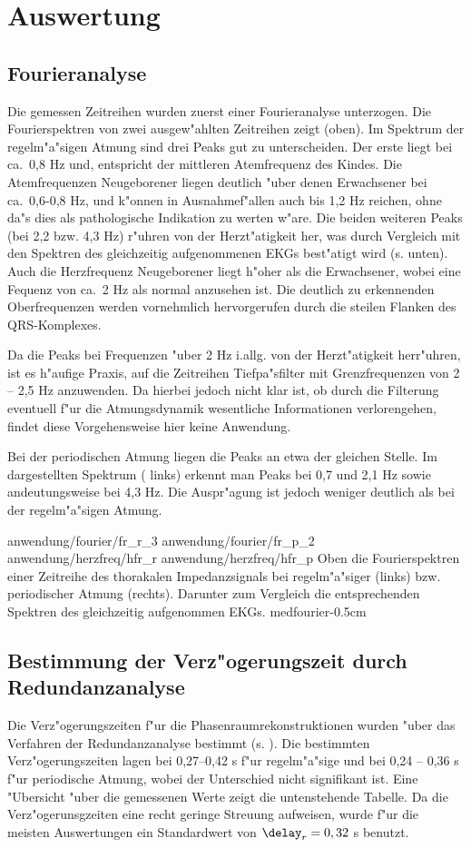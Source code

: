 \section{Auswertung} 

\subsection{Fourieranalyse}
Die gemessen Zeitreihen wurden zuerst einer Fourieranalyse
unterzogen. Die Fourierspektren von zwei ausgew"ahlten Zeitreihen zeigt 
(oben). Im Spektrum der regelm"a"sigen Atmung sind drei Peaks gut zu unterscheiden. Der
erste liegt bei ca.\ 0,8 Hz und, entspricht der mittleren Atemfrequenz des Kindes. Die
Atemfrequenzen Neugeborener liegen deutlich "uber denen Erwachsener bei ca.\ 
0,6-0,8 Hz, und k"onnen in Ausnahmef"allen auch bis 1,2 Hz reichen, ohne da"s dies als
pathologische Indikation zu werten w"are. Die beiden weiteren Peaks (bei 2,2 bzw. 4,3 Hz)
r"uhren von der Herzt"atigkeit her, was durch Vergleich mit den Spektren des gleichzeitig
aufgenommenen EKGs best"atigt wird (s. \psref{medfourier} unten). Auch die Herzfrequenz
Neugeborener liegt h"oher als die Erwachsener, wobei eine Fequenz von ca.\ 2 Hz als normal
anzusehen ist. Die deutlich zu erkennenden Oberfrequenzen werden vornehmlich hervorgerufen
durch die steilen Flanken des QRS-Komplexes.

Da die Peaks bei Frequenzen "uber 2 Hz i.allg. von der Herzt"atigkeit herr"uhren, ist es
h"aufige Praxis, auf die Zeitreihen Tiefpa"sfilter mit Grenzfrequenzen von 2 -- 2,5 Hz
anzuwenden. Da hierbei jedoch nicht klar ist, ob durch die Filterung eventuell f"ur die
Atmungsdynamik wesentliche Informationen verlorengehen, findet diese Vorgehensweise hier
keine Anwendung. 

Bei der periodischen Atmung liegen die Peaks an etwa der gleichen Stelle. Im dargestellten
Spektrum (\psref{medfourier} links) erkennt man Peaks bei 0,7 und 2,1 Hz sowie
andeutungsweise bei 4,3 Hz.  Die Auspr"agung ist jedoch weniger deutlich als bei der
regelm"a"sigen Atmung.


\epsfigfour
{anwendung/fourier/fr_r_3}
{anwendung/fourier/fr_p_2}
{anwendung/herzfreq/hfr_r}
{anwendung/herzfreq/hfr_p}
{Oben die Fourierspektren einer Zeitreihe des thorakalen Impedanzsignals bei regelm"a"siger (links)
  bzw. periodischer Atmung (rechts).  Darunter zum Vergleich die entsprechenden Spektren
  des gleichzeitig aufgenommen EKGs.
}
{medfourier}{-0.5cm}


\subsection{Bestimmung der Verz"ogerungszeit durch Redundanzanalyse}
Die Verz"ogerungszeiten f"ur die Phasenraumrekonstruktionen wurden "uber das Verfahren der 
Redundanzanalyse bestimmt (s. \psref{medredund}).  Die bestimmten Verz"ogerungszeiten
lagen bei 0,27--0,42 s f"ur regelm"a"sige und bei 0,24 -- 0,36 s f"ur periodische Atmung,
wobei der Unterschied nicht signifikant ist. Eine "Ubersicht "uber die gemessenen Werte
zeigt die untenstehende Tabelle. Da die Verz"ogerunsgzeiten eine recht geringe Streuung
aufweisen, wurde f"ur die meisten Auswertungen ein Standardwert von $\delay_r=0,32$ s
benutzt. 

